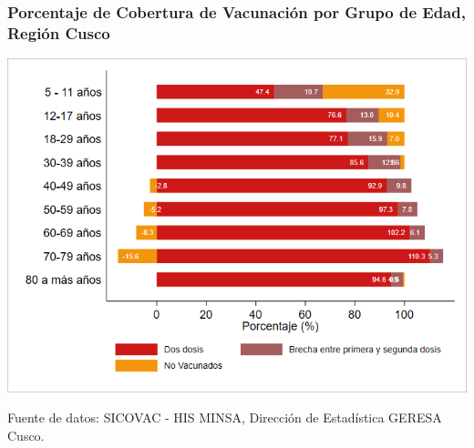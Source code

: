 \documentclass[xcolor=table]{beamer}
\begin{document}
\begin{frame}[label=cobertura_vacuna]
	\frametitle{Porcentaje de Cobertura de Vacunación por Grupo de Edad, Región Cusco}
	\vspace{-.5cm}
	\begin{center}
		\includegraphics[width=0.8\linewidth, trim={.2cm .5cm .2cm .2cm},clip]{../figuras/vacunacion_grupo_edad.png}
	\end{center}
	{\tiny Fuente de datos: SICOVAC - HIS MINSA, Dirección de Estadística GERESA Cusco.} 
\end{frame}
\end{document}
